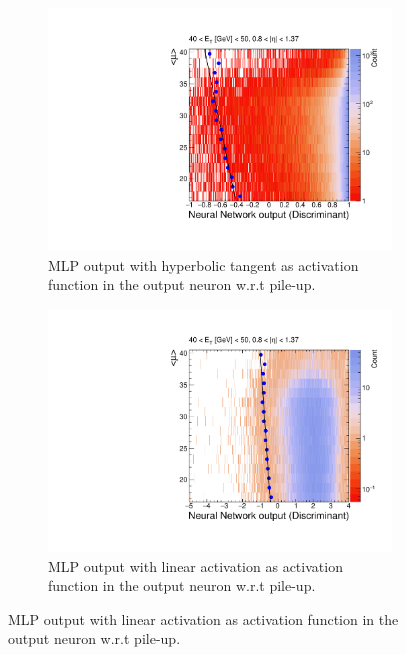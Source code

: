 \begin{figure}[h!tb]
  \begin{center}
  \begin{subfigure}[c]{.48\textwidth}
  \centering
  \includegraphics[width=\textwidth]{sections/02_ringer/figures/th2_signal_tight_cutbased_et3_eta1_with_tansig.pdf}
  \caption{MLP output with hyperbolic tangent as activation function in the output neuron w.r.t pile-up.}
  \label{fig:nn_correction_with_tansig}
  \end{subfigure}
  \hfill
  \begin{subfigure}[c]{.48\textwidth}
  \centering
  \includegraphics[width=\textwidth]{sections/02_ringer/figures/th2_signal_tight_cutbased_et3_eta1_without_tansig.pdf}
  \caption{MLP output with linear activation as activation function in the output neuron w.r.t pile-up.}

\end{subfigure}
\end{center}
\end{figure}

